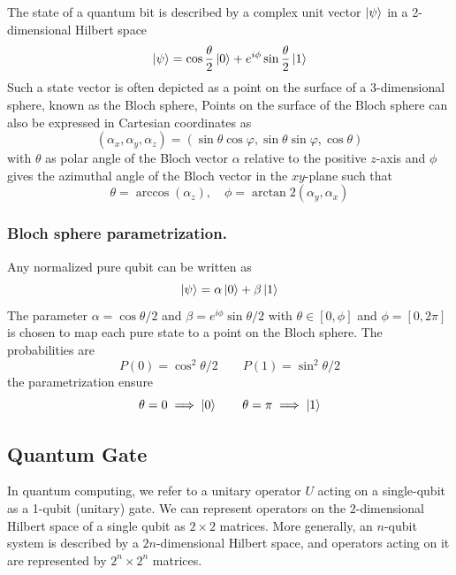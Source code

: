 \documentclass[../../../main.tex]{subfiles}
\begin{document}
The state of a quantum bit is described by a complex unit vector $\ket{\psi}$ in a 2-dimensional Hilbert space
\begin{equation*}
  \ket{ \psi} = \cos\frac{\theta}{2} \ket{ 0} + e^{i \phi} \sin\frac{\theta}{2}  \ket{ 1}
\end{equation*}
Such a state vector is often depicted as a point on the surface of a 3-dimensional sphere, known as the Bloch sphere,
Points on the surface of the Bloch sphere can also be expressed in Cartesian coordinates as
\begin{equation*}
  (\alpha_x, \alpha_y, \alpha_z) = \left( \sin \theta \cos \varphi, \sin \theta \sin \varphi, \cos \theta \right)
\end{equation*}
with $\theta$ as polar angle of the Bloch vector $\alpha$ relative to the positive $z$-axis and $\phi$ gives the azimuthal angle of the Bloch vector in the $xy$-plane such that
\begin{equation*}
  \theta = \arccos(\alpha_z), \quad \phi = \arctan2(\alpha_y, \alpha_x)
\end{equation*}

\subsubsection{Bloch sphere parametrization.}
Any normalized pure qubit can be written as
\begin{equation*}
  \ket{\psi} = \alpha \ket{0 } + \beta \ket{1}
\end{equation*}
The parameter $\alpha =  \cos \theta/2$ and $\beta = e ^{i\phi} \sin \theta/2$ with $\theta \in [0,\phi]$ and $\phi = [0,2\pi]$ is chosen to map each pure state to a point on the Bloch sphere.
The probabilities are
\begin{equation*}
  P(0) = \cos ^2 \theta/2\qquad
  P(1) = \sin ^2 \theta/2
\end{equation*}
the parametrization ensure
\begin{equation*}
  \theta = 0 \implies \ket{0}\qquad
  \theta = \pi \implies \ket{1}
\end{equation*}

\subsection{Quantum Gate}
In quantum computing, we refer to a unitary operator $U$ acting on a single-qubit as a 1-qubit (unitary) gate.
We can represent operators on the $2$-dimensional Hilbert space of a single qubit as $2 \times  2$ matrices.
More generally, an $n$-qubit system is described by a $2n$-dimensional Hilbert space, and operators acting on it are represented by $2^n \times 2^n$ matrices.
\end{document}
